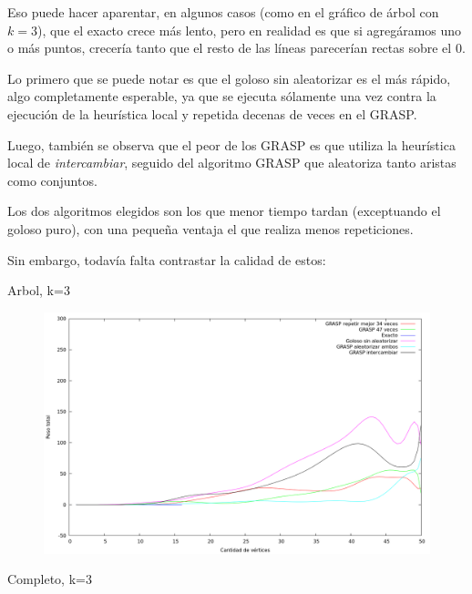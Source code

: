 Eso puede hacer aparentar, en algunos casos (como en el gráfico de árbol con
$k = 3$), que el exacto crece más lento, pero en realidad es que si agregáramos
uno o más puntos, crecería tanto que el resto de las líneas parecerían rectas
sobre el 0.

Lo primero que se puede notar es que el goloso sin aleatorizar es el más
rápido, algo completamente esperable, ya que se ejecuta sólamente una vez
contra la ejecución de la heurística local y repetida decenas de veces en el
GRASP.

Luego, también se observa que el peor de los GRASP es que utiliza la heurística
local de \textit{intercambiar}, seguido del algoritmo GRASP que aleatoriza
tanto aristas como conjuntos.

Los dos algoritmos elegidos son los que menor tiempo tardan (exceptuando el
goloso puro), con una pequeña ventaja el que realiza menos repeticiones.

Sin embargo, todavía falta contrastar la calidad de estos:

Arbol, k=3

\begin{figure}[H]
  \begin{center}
    \includegraphics[scale=0.35]{imagenes/ej6-arbol-k3-peso.png}
  \end{center}
\end{figure}

Completo, k=3

